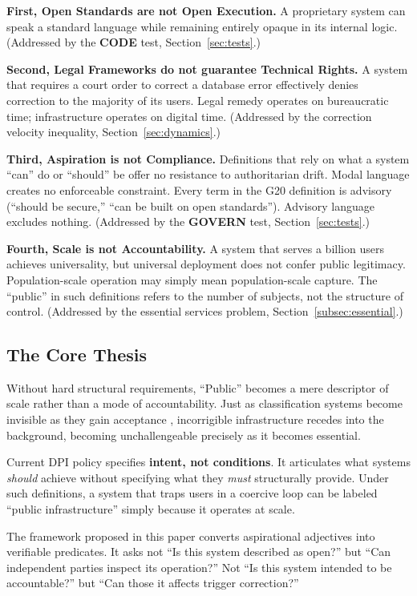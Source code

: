 \textbf{First, Open Standards are not Open Execution.} A proprietary system can speak a standard language while remaining entirely opaque in its internal logic. (Addressed by the \textbf{CODE} test, Section~\ref{sec:tests}.)

\textbf{Second, Legal Frameworks do not guarantee Technical Rights.} A system that requires a court order to correct a database error effectively denies correction to the majority of its users. Legal remedy operates on bureaucratic time; infrastructure operates on digital time. (Addressed by the correction velocity inequality, Section~\ref{sec:dynamics}.)

\textbf{Third, Aspiration is not Compliance.} Definitions that rely on what a system ``can'' do or ``should'' be offer no resistance to authoritarian drift. Modal language creates no enforceable constraint. Every term in the G20 definition is advisory (``should be secure,'' ``can be built on open standards''). Advisory language excludes nothing. (Addressed by the \textbf{GOVERN} test, Section~\ref{sec:tests}.)

\textbf{Fourth, Scale is not Accountability.} A system that serves a billion users achieves universality, but universal deployment does not confer public legitimacy. Population-scale operation may simply mean population-scale capture. The ``public'' in such definitions refers to the number of subjects, not the structure of control. (Addressed by the essential services problem, Section~\ref{subsec:essential}.)

\subsection{The Core Thesis}

Without hard structural requirements, ``Public'' becomes a mere descriptor of scale rather than a mode of accountability. Just as classification systems become invisible as they gain acceptance \citep{bowker1999}, incorrigible infrastructure recedes into the background, becoming unchallengeable precisely as it becomes essential.

\begin{clarification}[title=The Definitional Problem]
Current DPI policy specifies \textbf{intent, not conditions}. It articulates what systems \textit{should} achieve without specifying what they \textit{must} structurally provide. Under such definitions, a system that traps users in a coercive loop can be labeled ``public infrastructure'' simply because it operates at scale.

The framework proposed in this paper converts aspirational adjectives into verifiable predicates. It asks not ``Is this system described as open?'' but ``Can independent parties inspect its operation?'' Not ``Is this system intended to be accountable?'' but ``Can those it affects trigger correction?''
\end{clarification}

